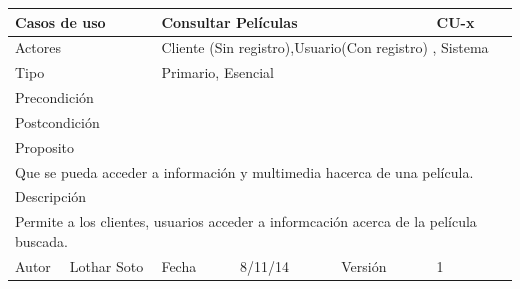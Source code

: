 \documentclass{article}
\begin{document}
\begin{table}[h]
\begin{tabular}{|l|l|l|l|l|l|}
\hline
\multicolumn{2}{|p{2cm}|}{Casos de uso}  & \multicolumn{3}{p{7cm}|}{\textbf{Consultar Películas}} & CU-x \\
\hline
\multicolumn{2}{|p{2cm}|}{Actores}       & \multicolumn{4}{p{8cm}|}{Cliente (Sin registro),Usuario(Con registro) , Sistema}        \\
\hline
\multicolumn{2}{|p{2cm}|}{Tipo}          & \multicolumn{4}{p{8cm}|}{Primario, Esencial}        \\
\hline
\multicolumn{2}{|p{2cm}|}{Precondición}  & \multicolumn{4}{p{8cm}|}{}        \\
\hline
\multicolumn{2}{|p{2cm}|}{Postcondición} & \multicolumn{4}{p{8cm}|}{}        \\
\hline
\multicolumn{6}{|p{10cm}|}{Proposito}                                   \\
\hline
\multicolumn{6}{|p{10cm}|}{Que se pueda acceder a información y multimedia hacerca de una película.}                                            \\
\hline
\multicolumn{6}{|p{10cm}|}{Descripción}                                 \\
\hline
\multicolumn{6}{|p{10cm}|}{Permite a los clientes, usuarios acceder a informcación acerca de la película buscada.}                                            \\
\hline
Autor              &     Lothar Soto         & Fecha    &  8/11/14   &   Versión  & 1\\     
\hline
\end{tabular}
\end{table}
\end{document}
